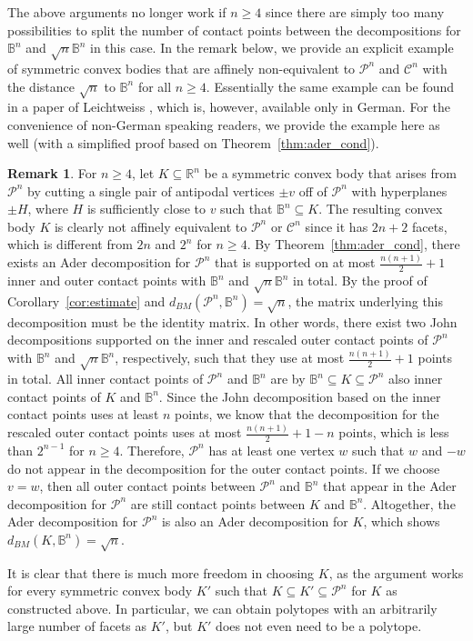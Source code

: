 \documentclass[12pt,a4paper]{article}
\theoremstyle{definition}
\newtheorem{remark}[twr]{Remark}
\newcommand\R{\mathbb{R}}
\newcommand\B{\mathbb{B}}
\newcommand\CC{\mathcal{C}}
\newcommand\CP{\mathcal{P}}
\begin{document}
The above arguments no longer work if $n \geq 4$ since there are simply too many possibilities to split the number of contact points between the decompositions for $\B^n$ and $\sqrt{n}\B^n$ in this case. In the remark below, we provide an explicit example of symmetric convex bodies that are affinely non-equivalent to $\CP^n$ and $\CC^n$ with the distance $\sqrt{n}$ to $\B^n$ for all $n \geq 4$. Essentially the same example can be found in a paper of Leichtweiss \cite{leichtweiss}, which is, however, available only in German. For the convenience of non-German speaking readers, we provide the example here as well (with a simplified proof based on Theorem~\ref{thm:ader_cond}).



\begin{remark}
\label{rem:higher_dim}
For $n \geq 4$, let $K \subseteq \R^n$ be a symmetric convex body that arises from $\CP^n$ by cutting a single pair of antipodal vertices $\pm v$ off of $\CP^n$ with hyperplanes $\pm H$, where $H$ is sufficiently close to $v$ such that $\B^n \subseteq K$. The resulting convex body $K$ is clearly not affinely equivalent to $\CP^n$ or $\CC^n$ since it has $2n+2$ facets, which is different from $2n$ and $2^n$ for $n \geq 4$. By Theorem~\ref{thm:ader_cond}, there exists an Ader decomposition for $\CP^n$ that is supported on at most $\frac{n (n+1)}{2} + 1$ inner and outer contact points with $\B^n$ and $\sqrt{n} \B^n$ in total. By the proof of Corollary~\ref{cor:estimate} and $d_{BM}(\CP^n,\B^n) = \sqrt{n}$, the matrix underlying this decomposition must be the identity matrix. In other words, there exist two John decompositions supported on the inner and rescaled outer contact points of $\CP^n$ with $\B^n$ and $\sqrt{n} \B^n$, respectively, such that they use at most $\frac{n (n+1)}{2} + 1$ points in total. All inner contact points of $\CP^n$ and $\B^n$ are by $\B^n \subseteq K \subseteq \CP^n$ also inner contact points of $K$ and $\B^n$. Since the John decomposition based on the inner contact points uses at least $n$ points, we know that the decomposition for the rescaled outer contact points uses at most $\frac{n (n+1)}{2} + 1 - n$ points, which is less than $2^{n-1}$ for $n \geq 4$. Therefore, $\CP^n$ has at least one vertex $w$ such that $w$ and $-w$ do not appear in the decomposition for the outer contact points. If we choose $v = w$, then all outer contact points between $\CP^n$ and $\B^n$ that appear in the Ader decomposition for $\CP^n$ are still contact points between $K$ and $\B^n$. Altogether, the Ader decomposition for $\CP^n$ is also an Ader decomposition for $K$, which shows $d_{BM}(K,\B^n) = \sqrt{n}$.

It is clear that there is much more freedom in choosing $K$, as the argument works for every symmetric convex body $K'$ such that $K \subseteq K' \subseteq \CP^n$ for $K$ as constructed above. In particular, we can obtain polytopes with an arbitrarily large number of facets as $K'$, but $K'$ does not even need to be a polytope.
\end{remark}
\end{document}
